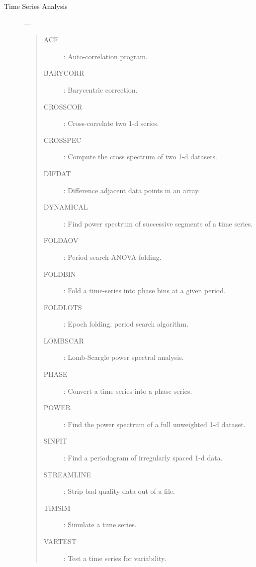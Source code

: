 \begin{description}
\item [Time Series Analysis] ---
\begin{quote}
\begin{description}
\item [ACF] :      Auto-correlation program.
\item [BARYCORR] : Barycentric correction.
\item [CROSSCOR] : Cross-correlate two 1-d series.
\item [CROSSPEC] : Compute the cross spectrum of two 1-d datasets.
\item [DIFDAT] :   Difference adjacent data points in an array.
\item [DYNAMICAL] : Find power spectrum of successive segments of a time series.
\item [FOLDAOV] :  Period search ANOVA folding.
\item [FOLDBIN] :  Fold a time-series into phase bins at a given period.
\item [FOLDLOTS] : Epoch folding, period search algorithm.
\item [LOMBSCAR] : Lomb-Scargle power spectral analysis.
\item [PHASE] :    Convert a time-series into a phase series.
\item [POWER] :    Find the power spectrum of a full unweighted 1-d dataset.
\item [SINFIT] :   Find a periodogram of irregularly spaced 1-d data.
\item [STREAMLINE] : Strip bad quality data out of a file.
\item [TIMSIM] :   Simulate a time series.
\item [VARTEST] :  Test a time series for variability.
\end{description}
\end{quote}


\end{description}
